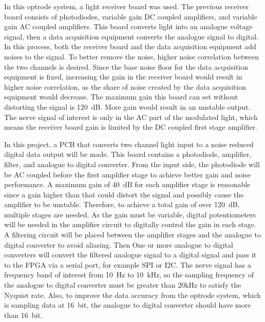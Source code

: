 In this optrode system, a light receiver board was used.  The previous receiver board consists of photodiodes, variable gain DC coupled amplifiers, and variable gain AC coupled amplifiers.  This board converts light into an analogue voltage signal, then a data acquisition equipment converts the analogue signal to digital.  In this process, both the receiver board and the data acquisition equipment add noises to the signal.  To better remove the noise, higher noise correlation between the two channels is desired.  Since the base noise floor for the data acquisition equipment is fixed, increasing the gain in the receiver board would result in higher noise correlation, as the share of noise created by the data acquisition equipment would decrease.  The maximum gain this board can set without distorting the signal is \qty{120}{dB}.  More gain would result in an unstable output.  The nerve signal of interest is only in the AC part of the modulated light, which means the receiver board gain is limited by the DC coupled first stage amplifier.  

In this project, a PCB that converts two channel light input to a noise reduced digital data output will be made.  This board contains a photodiode, amplifier, filter, and analogue to digital converter.  From the input side, the photodiode will be AC coupled before the first amplifier stage to achieve better gain and noise performance.  A maximum gain of \qty{40}{dB} for each amplifier stage is reasonable since a gain higher than that could distort the signal and possibly cause the amplifier to be unstable.  Therefore, to achieve a total gain of over \qty{120}{dB}, multiple stages are needed.  As the gain must be variable, digital potentiometers will be needed in the amplifier circuit to digitally control the gain in each stage.  A filtering circuit will be placed between the amplifier stages and the analogue to digital converter to avoid aliasing.  Then One or more analogue to digital converters will convert the filtered analogue signal to a digital signal and pass it to the FPGA via a serial port, for example SPI or I2C.  The nerve signal has a frequency band of interest from \qty{10}{Hz} to \qty{10}{kHz}, so the sampling frequency of the analogue to digital converter must be greater than 20kHz to satisfy the Nyquist rate.  Also, to improve the data accuracy from the optrode system, which is sampling data at \qty{16}{bit}, the analogue to digital converter should have more than \qty{16}{bit}.

